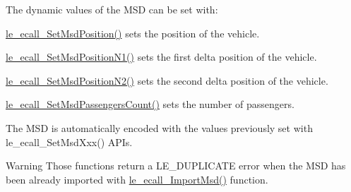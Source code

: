The dynamic values of the M\+SD can be set with\+:
\begin{DoxyItemize}
\item \hyperlink{le__ecall__interface_8h_a2b56b7b7fd7f936c144d30eba7815908}{le\+\_\+ecall\+\_\+\+Set\+Msd\+Position()} sets the position of the vehicle.
\item \hyperlink{le__ecall__interface_8h_af3cfea09eea1b1ba39648798070ad139}{le\+\_\+ecall\+\_\+\+Set\+Msd\+Position\+N1()} sets the first delta position of the vehicle.
\item \hyperlink{le__ecall__interface_8h_a6b25b9b242ba114f31ae2f853070bf11}{le\+\_\+ecall\+\_\+\+Set\+Msd\+Position\+N2()} sets the second delta position of the vehicle.
\item \hyperlink{le__ecall__interface_8h_a8c009bb03d61dcd0ffbd9e986b692a85}{le\+\_\+ecall\+\_\+\+Set\+Msd\+Passengers\+Count()} sets the number of passengers.
\end{DoxyItemize}

The M\+SD is automatically encoded with the values previously set with le\+\_\+ecall\+\_\+\+Set\+Msd\+Xxx() A\+P\+Is.

\begin{DoxyWarning}{Warning}
Those functions return a L\+E\+\_\+\+D\+U\+P\+L\+I\+C\+A\+TE error when the M\+SD has been already imported with \hyperlink{le__ecall__interface_8h_a7d8d8c1e1f49af2f6145836975d20aeb}{le\+\_\+ecall\+\_\+\+Import\+Msd()} function.
\end{DoxyWarning}

